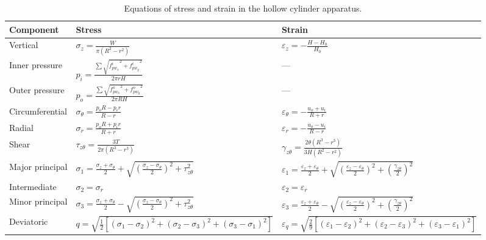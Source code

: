 \begin{table}[t]
  \centering
  \caption{Equations of stress and strain in the hollow cylinder apparatus.}
  \label{tab:hca_equations}
  \begin{tabular}{@{}lll@{}}
    \toprule
    Component & Stress & Strain \\
    \midrule
    Vertical &
    $\displaystyle\sigma_z = \frac{W}{\pi(R^2-r^2)}$ &
    $\displaystyle\varepsilon_z = -\frac{H-H_0}{H_0}$ \\[12pt]
    Inner pressure &
    $\displaystyle p_i = \frac{\sum\!\sqrt{{f_{pw_x}^{i}}^2+{f_{pw_y}^{i}}^2}}{2\pi r H}$ &
    --- \\[12pt]
    Outer pressure &
    $\displaystyle p_o = \frac{\sum\!\sqrt{{f_{pw_x}^{o}}^2+{f_{pw_y}^{o}}^2}}{2\pi R H}$ &
    --- \\[12pt]
    Circumferential &
    $\displaystyle\sigma_\theta = \frac{p_o R - p_i r}{R-r}$ &
    $\displaystyle\varepsilon_\theta = -\frac{u_o+u_i}{R+r}$ \\[12pt]
    Radial &
    $\displaystyle\sigma_r = \frac{p_o R + p_i r}{R+r}$ &
    $\displaystyle\varepsilon_r = -\frac{u_o-u_i}{R-r}$ \\[12pt]
    Shear &
    $\displaystyle\tau_{z\theta} = \frac{3T}{2\pi(R^3-r^3)}$ &
    $\displaystyle\gamma_{z\theta} = \frac{2\theta(R^3-r^3)}{3H(R^2-r^2)}$ \\[12pt]
    Major principal &
    $\displaystyle\sigma_1 = \frac{\sigma_z+\sigma_\theta}{2}+\sqrt{\left(\frac{\sigma_z-\sigma_\theta}{2}\right)^{\!2}+\tau_{z\theta}^2}$ &
    $\displaystyle\varepsilon_1 = \frac{\varepsilon_z+\varepsilon_\theta}{2}+\sqrt{\left(\frac{\varepsilon_z-\varepsilon_\theta}{2}\right)^{\!2}+\left(\frac{\gamma_{z\theta}}{2}\right)^{\!2}}$ \\[12pt]
    Intermediate &
    $\sigma_2 = \sigma_r$ &
    $\varepsilon_2 = \varepsilon_r$ \\[12pt]
    Minor principal &
    $\displaystyle\sigma_3 = \frac{\sigma_z+\sigma_\theta}{2}-\sqrt{\left(\frac{\sigma_z-\sigma_\theta}{2}\right)^{\!2}+\tau_{z\theta}^2}$ &
    $\displaystyle\varepsilon_3 = \frac{\varepsilon_z+\varepsilon_\theta}{2}-\sqrt{\left(\frac{\varepsilon_z-\varepsilon_\theta}{2}\right)^{\!2}+\left(\frac{\gamma_{z\theta}}{2}\right)^{\!2}}$ \\[12pt]
    Deviatoric &
    $\displaystyle q = \sqrt{\tfrac{1}{2}\!\left[(\sigma_1-\sigma_2)^2+(\sigma_2-\sigma_3)^2+(\sigma_3-\sigma_1)^2\right]}$ &
    $\displaystyle\varepsilon_q = \sqrt{\tfrac{2}{9}\!\left[(\varepsilon_1-\varepsilon_2)^2+(\varepsilon_2-\varepsilon_3)^2+(\varepsilon_3-\varepsilon_1)^2\right]}$ \\[6pt]
    \bottomrule
  \end{tabular}
\end{table}
